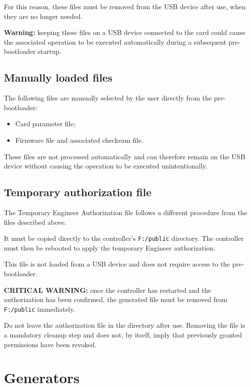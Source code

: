 ﻿\documentclass[11pt,a4paper]{article}
\newcommand{\filename}[1]{\texttt{#1}}
\begin{document}
For this reason, these files must be removed from the USB device
after use, when they are no longer needed.

\textbf{Warning:} keeping these files on a USB device connected to
the card could cause the associated operation to be executed
automatically during a subsequent pre-bootloader startup.

\subsection{Manually loaded files}

The following files are manually selected by the user directly
from the pre-bootloader:

\begin{itemize}
    \item Card parameter file;
    \item Firmware file and associated checksum file.
\end{itemize}

These files are not processed automatically and can therefore remain
on the USB device without causing the operation to be executed
unintentionally.

\subsection{Temporary authorization file}

The Temporary Engineer Authorization file follows a different
procedure from the files described above.

It must be copied directly to the controller's
\filename{F:/public} directory. The controller must then be rebooted
to apply the temporary Engineer authorization.

This file is not loaded from a USB device and does not require
access to the pre-bootloader.

\textbf{CRITICAL WARNING:} once the controller has restarted and
the authorization has been confirmed, the generated file must be
removed from \filename{F:/public} immediately.

Do not leave the authorization file in the directory after use.
Removing the file is a mandatory cleanup step and does not, by
itself, imply that previously granted permissions have been revoked.

\section{Generators}
\end{document}
